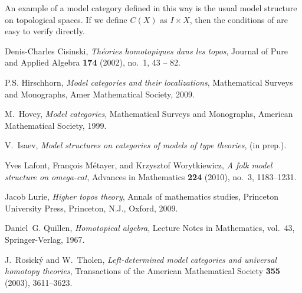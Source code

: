 \documentclass{tac}
\theoremstyle{definition}
\begin{document}
\begin{exmp}
An example of a model category defined in this way is the usual model structure on topological spaces.
If we define $C(X)$ as $I \times X$, then the conditions of  are easy to verify directly.
\end{exmp}

\begin{references*}

Denis-Charles Cisinski, \emph{Théories homotopiques dans les topos}, Journal
  of Pure and Applied Algebra \textbf{174} (2002), no.~1, 43 -- 82.

P.S. Hirschhorn, \emph{Model categories and their localizations}, Mathematical
  Surveys and Monographs, Amer Mathematical Society, 2009.

M.~Hovey, \emph{Model categories}, Mathematical Surveys and Monographs,
  American Mathematical Society, 1999.

V.~{Isaev}, \emph{Model structures on categories of models of type theories},
  (in prep.).

Yves Lafont, Fran{\c c}ois M{\'e}tayer, and Krzysztof Worytkiewicz, \emph{{A
  folk model structure on omega-cat}}, Advances in Mathematics \textbf{224}
  (2010), no.~3, 1183--1231.

Jacob Lurie, \emph{Higher topos theory}, Annals of mathematics studies,
  Princeton University Press, Princeton, N.J., Oxford, 2009.

Daniel~G. Quillen, \emph{Homotopical algebra}, Lecture Notes in Mathematics,
  vol.~43, Springer-Verlag, 1967.

J.~Rosick{\'y} and W.~Tholen, \emph{Left-determined model categories and
  universal homotopy theories}, Transactions of the American Mathematical
  Society \textbf{355} (2003), 3611--3623.

\end{references*}
\end{document}

